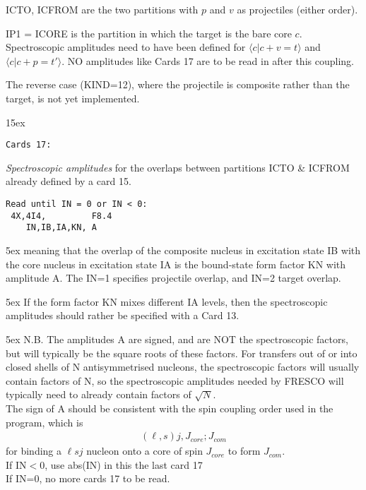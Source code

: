 \documentclass[11pt]{article}
\newcommand{\beqn}{\begin{eqnarray*}}
\newcommand{\eeqn}{\end{eqnarray*}}
\begin{document}
\noindent
ICTO, ICFROM are the two partitions with $p$ and $v$ as projectiles (either order).

\noindent
IP1 = ICORE is the partition in which the target is the bare  core  $c$.\\

Spectroscopic amplitudes need to have been defined for $\langle c | c+v = t \rangle$  and $\langle c | c+p = t'  \rangle$. 
NO amplitudes like Cards 17 are to be read in after this coupling.

The reverse case (KIND=12), where the projectile is composite rather than the target, is not yet implemented.

\newpage


\hangindent 15ex
\begin{verbatim}
Cards 17:
\end{verbatim}
  {\em Spectroscopic amplitudes} {\rm for the overlaps between
partitions ICTO \& ICFROM already defined by a card 15}.

\begin{verbatim}
Read until IN = 0 or IN < 0:
 4X,4I4,         F8.4
    IN,IB,IA,KN, A
\end{verbatim}

\hangindent 5ex
meaning that the overlap of the composite nucleus in excitation
state IB with the core nucleus in excitation state IA is the
bound-state form factor KN with amplitude A. The IN=1 specifies
projectile overlap, and IN=2 target overlap.

\hangindent 5ex
 If the form factor KN mixes different IA levels, then the spectroscopic
 amplitudes should rather be specified with a Card 13.

\hangindent 5ex
N.B. The amplitudes A are signed, and are NOT the spectroscopic
factors, but will typically be the square roots of these factors.
For transfers out of or into closed shells of N antisymmetrised nucleons,
the spectroscopic factors will usually contain factors of N,
so the spectroscopic amplitudes needed by FRESCO will typically
need to already contain factors of $\sqrt{N}$.
\\
The sign of A should be consistent with the spin coupling order used in
the program, which is
\beqn
  (\ell,s)j, J_{core}; J_{com}
\eeqn
for binding a $\ell sj$ nucleon onto a core of spin $J_{core}$ to form $J_{com}$.
\\
 If IN$<$0, use abs(IN) in this the last card 17\\
 If IN=0, no more cards 17 to be read.
\end{document}
